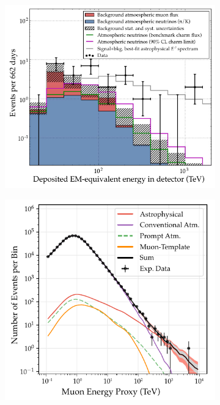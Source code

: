 \documentclass[
    a4paper, %
    fontsize=10pt, %
    twoside=false, %
    numbers=noenddot, %
    fontmethod=tex,
]{kaobook}
\begin{document}
\begin{figure}[htb]
\centering
    \begin{subfigure}[b]{0.52\textwidth}
    \centering
    \includegraphics[width=1\textwidth]{theory/ic_first_spectrum.pdf}
    \end{subfigure}
    \begin{subfigure}[b]{0.47\textwidth}
    \centering
    \includegraphics[width=1\textwidth]{theory/ic_last_spectrum.pdf}

\end{subfigure}
\end{figure}
\end{document}
